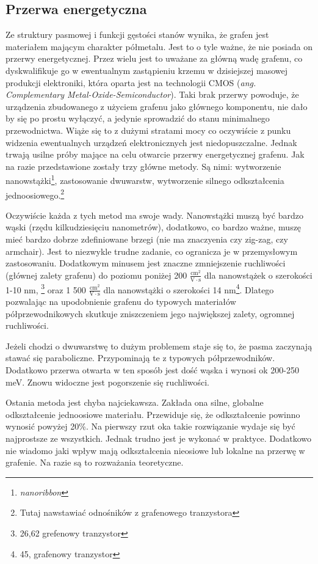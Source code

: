 	\subsection{Przerwa energetyczna}
	Ze struktury pasmowej i funkcji gęstości stanów wynika, że grafen jest materiałem mającym charakter półmetalu.
	Jest to o tyle ważne, że nie posiada on przerwy energetycznej. Przez wielu jest to uważane za główną wadę
	grafenu, co dyskwalifikuje go w ewentualnym zastąpieniu krzemu w dzisiejszej masowej produkcji elektroniki, która
	 oparta
	jest na technologii CMOS (\textit{ang. Complementary Metal-Oxide-Semiconductor}). Taki brak przerwy powoduje, 
	że urządzenia zbudowanego z użyciem grafenu jako głównego komponentu, nie dało by się po prostu wyłączyć, a jedynie
	sprowadzić do stanu minimalnego przewodnictwa. Wiąże się to z dużymi stratami mocy co oczywiście z punku widzenia
	ewentualnych urządzeń elektronicznych jest niedopuszczalne. 
	Jednak trwają usilne próby mające na celu otwarcie przerwy energetycznej grafenu. Jak na razie przedstawione zostały
	trzy główne metody. Są nimi: wytworzenie nanowstążki\footnote{\textit{nanoribbon}}, zastosowanie dwuwarstw, 
	wytworzenie silnego odkształcenia jednoosiowego.\footnote{Tutaj nawstawiać odnośników z grafenowego tranzystora}
	
	Oczywiście każda z tych metod ma swoje wady. Nanowstążki muszą być bardzo wąski (rzędu kilkudziesięciu nanometrów),
	dodatkowo, co bardzo ważne, muszę mieć bardzo dobrze zdefiniowane brzegi (nie ma znaczyenia czy zig-zag, czy 
	armchair). Jest to niezwykle trudne zadanie, co ogranicza je w przemysłowym zastosowaniu. Dodatkowym minusem jest
	znaczne zmniejszenie ruchliwości (głównej zalety grafenu) do poziomu poniżej 200 $\mathrm{\frac{cm^2}{V\cdot s}}$
	dla nanowstążek o szerokości 1-10 nm, \footnote{26,62 grefenowy tranzystor} oraz 1 500 
	$\mathrm{\frac{cm^2}{V\cdot s}}$ dla nanowstążki o szerokości 14 nm\footnote{45, grafenowy tranzystor}. 
	Dlatego pozwalając na upodobnienie grafenu do typowych materiałów półprzewodnikowych skutkuje zniszczeniem
	jego największej zalety, ogromnej ruchliwości.
	
	Jeżeli chodzi o dwuwarstwę to dużym problemem staje się to, że pasma zaczynają stawać się paraboliczne. Przypominają
	te z typowych półprzewodników. Dodatkowo przerwa otwarta w ten sposób jest dość wąska i wynosi ok 200-250 meV.
	Znowu widoczne jest pogorszenie się ruchliwości.

	Ostania metoda jest chyba najciekawsza. Zakłada ona silne, globalne odkształcenie jednoosiowe materiału. 
	Przewiduje się, że odkształcenie powinno wynosić powyżej 20\%. Na pierwszy rzut oka takie rozwiązanie wydaje
	się być najprostsze ze wszystkich. Jednak trudno jest je wykonać w praktyce. Dodatkowo nie wiadomo jaki wpływ
	mają odkształcenia nieosiowe lub lokalne na przerwę w grafenie. Na razie są to rozważania teoretyczne.

